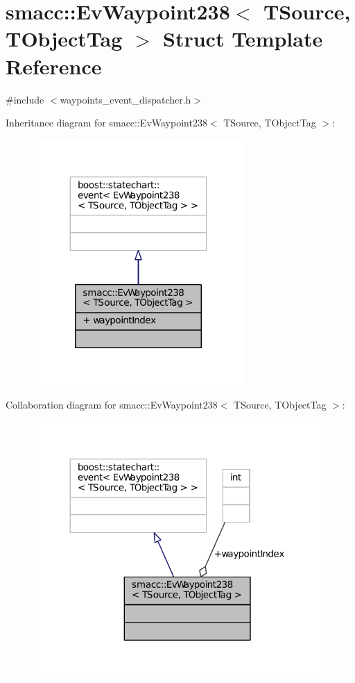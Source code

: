 \hypertarget{structsmacc_1_1EvWaypoint238}{}\section{smacc\+:\+:Ev\+Waypoint238$<$ T\+Source, T\+Object\+Tag $>$ Struct Template Reference}
\label{structsmacc_1_1EvWaypoint238}


{\ttfamily \#include $<$waypoints\+\_\+event\+\_\+dispatcher.\+h$>$}



Inheritance diagram for smacc\+:\+:Ev\+Waypoint238$<$ T\+Source, T\+Object\+Tag $>$\+:
\nopagebreak
\begin{figure}[H]
\begin{center}
\leavevmode
\includegraphics[width=227pt]{structsmacc_1_1EvWaypoint238__inherit__graph}
\end{center}
\end{figure}


Collaboration diagram for smacc\+:\+:Ev\+Waypoint238$<$ T\+Source, T\+Object\+Tag $>$\+:
\nopagebreak
\begin{figure}[H]
\begin{center}
\leavevmode
\includegraphics[width=312pt]{structsmacc_1_1EvWaypoint238__coll__graph}
\end{center}
\end{figure}
